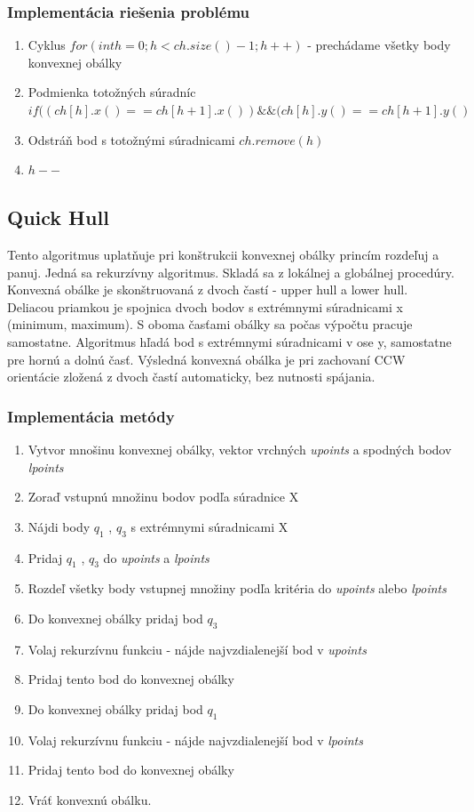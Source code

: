 \documentclass[12pt]{article}
\begin{document}
\subsubsection {Implementácia riešenia problému}
\begin{enumerate}
\item Cyklus $ for (int h = 0 ; h < ch.size() - 1; h++)$ - prechádame všetky body konvexnej obálky
\item \hspace {1.5cm}  Podmienka totožných súradníc 
\newline  $ if ((ch[h].x() == ch[h+1].x( )) \&\& (ch[h].y() == ch[h+1].y( ) $
\item \hspace {1.5cm} Odstráň  bod s totožnými súradnicami $ ch.remove(h) $
\item \hspace {1.5cm} $h--$
\end{enumerate}

\subsection {Quick Hull}
Tento algoritmus uplatňuje pri konštrukcii konvexnej obálky princím rozdeľuj a panuj. Jedná sa rekurzívny algoritmus. Skladá sa z lokálnej a globálnej procedúry. Konvexná obálke je skonštruovaná z dvoch častí - upper hull a lower hull. Deliacou priamkou je spojnica dvoch bodov s extrémnymi súradnicami x (minimum, maximum). S oboma časťami obálky sa počas výpočtu pracuje samostatne. Algoritmus hľadá bod s extrémnymi súradnicami v ose y, samostatne pre hornú a dolnú časť. Výsledná konvexná obálka je pri zachovaní CCW orientácie zložená z dvoch častí automaticky, bez nutnosti spájania.

\subsubsection{Implementácia metódy}
\begin{enumerate}
\item Vytvor mnošinu konvexnej obálky, vektor vrchných \textit{upoints} a spodných bodov \textit{lpoints}
\item Zoraď vstupnú množinu bodov podľa súradnice X
\item Nájdi body $q_1$ , $q_3$  s extrémnymi súradnicami X 
\item  \hspace {1.5cm} Pridaj $q_1$ , $q_3$ do \textit{upoints} a \textit{lpoints}
\item Rozdeľ všetky body vstupnej množiny podľa kritéria do \textit{upoints} alebo \textit{lpoints}
\item Do konvexnej obálky pridaj bod $q_3$
\item  \hspace {1.5cm} Volaj rekurzívnu funkciu - nájde najvzdialenejší bod v \textit{upoints}
\item  \hspace {1.5cm} Pridaj tento bod do konvexnej obálky
\item Do konvexnej obálky pridaj bod $q_1$
\item  \hspace {1.5cm} Volaj rekurzívnu funkciu - nájde najvzdialenejší bod v \textit{lpoints}
\item  \hspace {1.5cm} Pridaj tento bod do konvexnej obálky
\item  Vráť konvexnú obálku.
\end{enumerate}
\end{document}
